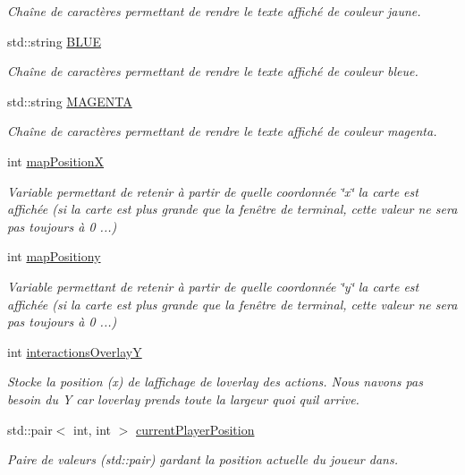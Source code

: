 \begin{DoxyCompactItemize}
\begin{DoxyCompactList}\small\item\em Chaîne de caractères permettant de rendre le texte affiché de couleur jaune. \end{DoxyCompactList}\item 
std\+::string \hyperlink{namespaceio_aad76ed62886e76ca53a755d1c917e387}{B\+L\+UE}
\begin{DoxyCompactList}\small\item\em Chaîne de caractères permettant de rendre le texte affiché de couleur bleue. \end{DoxyCompactList}\item 
std\+::string \hyperlink{namespaceio_a1e4a43cea85f576e62aebce6aabc60b5}{M\+A\+G\+E\+N\+TA}
\begin{DoxyCompactList}\small\item\em Chaîne de caractères permettant de rendre le texte affiché de couleur magenta. \end{DoxyCompactList}\item 
int \hyperlink{namespaceio_a7f2af984af03881a45da957db2c48be2}{map\+PositionX}
\begin{DoxyCompactList}\small\item\em Variable permettant de retenir à partir de quelle coordonnée \char`\"{}x\char`\"{} la carte est affichée (si la carte est plus grande que la fenêtre de terminal, cette valeur ne sera pas toujours à 0 ...) \end{DoxyCompactList}\item 
int \hyperlink{namespaceio_aa0322ffa705df7bd3c4fa5eaefde5d6d}{map\+Positiony}
\begin{DoxyCompactList}\small\item\em Variable permettant de retenir à partir de quelle coordonnée \char`\"{}y\char`\"{} la carte est affichée (si la carte est plus grande que la fenêtre de terminal, cette valeur ne sera pas toujours à 0 ...) \end{DoxyCompactList}\item 
int \hyperlink{namespaceio_af6147c2896f77caaa4c7d26daee44ac5}{interactions\+OverlayY}
\begin{DoxyCompactList}\small\item\em Stocke la position (x) de l\textquotesingle{}affichage de l\textquotesingle{}overlay des actions. Nous n\textquotesingle{}avons pas besoin du Y car l\textquotesingle{}overlay prends toute la largeur quoi qu\textquotesingle{}il arrive. \end{DoxyCompactList}\item 
std\+::pair$<$ int, int $>$ \hyperlink{namespaceio_a2a0c75ff7760b96fcf6e696efe3d1c51}{current\+Player\+Position}
\begin{DoxyCompactList}\small\item\em Paire de valeurs (std\+::pair) gardant la position actuelle du joueur dans. \end{DoxyCompactList}\end{DoxyCompactItemize}


